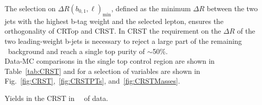 The selection on $\Delta R(b_{0,1},\ell)_{\mathrm{min}}$, defined as the minimum $\Delta R$ between the two jets with the highest b-tag weight and the selected lepton, ensures the orthogonality of CRTop and CRST. In CRST the requirement on the $\Delta R$ of the two leading-weight b-jets is necessary to reject a large part of the remaining \ttbar\ background and reach a single top purity of $\sim$50\%. \\
Data-MC comparisons in the single top control region are shown in Table~\ref{tab:CRST} and for a selection of variables are shown in Fig.~\ref{fig:CRST},~\ref{fig:CRSTPTs}, and~\ref{fig:CRSTMasses}. \\

\begin{table}[!htb]
  \centering
  
  \caption{Yields in the CRST in \intlumi\ \ifb\ of data.  }
  \label{tab:CRST}
\end{table}

